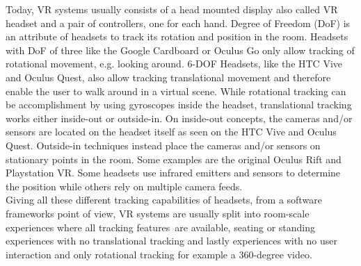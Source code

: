 Today, VR systems usually consists of a head mounted display also called VR headset and a pair of controllers, one for each hand. 
Degree of Freedom (DoF) is an attribute of headsets to track its rotation and position in the room. Headsets with DoF of three like the Google Cardboard or Oculus Go only allow tracking of rotational movement, e.g. looking around. 6-DOF Headsets, like the HTC Vive and Oculus Quest, also allow tracking translational movement and therefore enable the user to walk around in a virtual scene. 
While rotational tracking can be accomplishment by using gyroscopes inside the headset, translational tracking works either inside-out or outside-in. On inside-out concepts, the cameras and/or sensors are located on the headset itself as seen on the HTC Vive and Oculus Quest. Outside-in techniques instead place the cameras and/or sensors on stationary points in the room. Some examples are the original Oculus Rift and Playstation VR.
Some headsets use infrared emitters and sensors to determine the position while others rely on multiple camera feeds.\\
Giving all these different tracking capabilities of headsets, from a software frameworks point of view, VR systems are usually split into room-scale \label{exp:vr-experience}experiences where all tracking features are available, seating or standing experiences with no translational tracking and lastly experiences with no user interaction and only rotational tracking for example a 360-degree video.